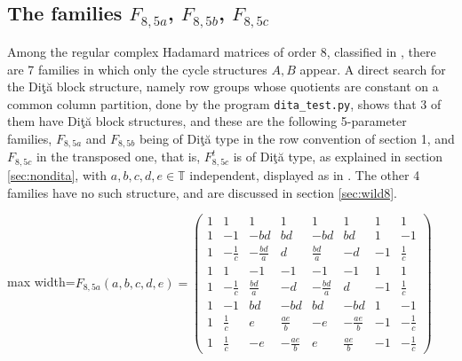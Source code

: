 \documentclass[11pt]{amsart}
\newcommand{\T}{\mathbb T}
\begin{document}
\subsection{The families $F_{8,5a}$, $F_{8,5b}$, $F_{8,5c}$}\label{sec:f85}

Among the regular complex Hadamard matrices of order 8, classified in \cite{gt}, there are 7 families in which only the cycle structures $A,B$ appear. A direct search for the Di\c t\u a block structure, namely row groups whose quotients are constant on a common column partition, done by the program \texttt{dita\_test.py}, shows that 3 of them have Di\c t\u a block structures, and these are the following 5-parameter families, $F_{8,5a}$ and $F_{8,5b}$ being of Di\c t\u a type in the row convention of section 1, and $F_{8,5c}$ in the transposed one, that is, $F_{8,5c}^t$ is of Di\c t\u a type, as explained in section \ref{sec:nondita}, with $a,b,c,d,e\in\T$ independent, displayed as in \cite{gt}. The other 4 families have no such structure, and are discussed in section \ref{sec:wild8}.

\begin{center}\normalsize\setlength{\arraycolsep}{3.8pt}
\begin{adjustbox}{max width=\textwidth}$\displaystyle F_{8,5a}(a,b,c,d,e)=\begin{pmatrix}
1 & 1 & 1 & 1 & 1 & 1 & 1 & 1 \\
1 & -1 & -bd & bd & -bd & bd & 1 & -1 \\
1 & -\frac{1}{c} & -\frac{bd}{a} & d & \frac{bd}{a} & -d & -1 & \frac{1}{c} \\
1 & 1 & -1 & -1 & -1 & -1 & 1 & 1 \\
1 & -\frac{1}{c} & \frac{bd}{a} & -d & -\frac{bd}{a} & d & -1 & \frac{1}{c} \\
1 & -1 & bd & -bd & bd & -bd & 1 & -1 \\
1 & \frac{1}{c} & e & \frac{ae}{b} & -e & -\frac{ae}{b} & -1 & -\frac{1}{c} \\
1 & \frac{1}{c} & -e & -\frac{ae}{b} & e & \frac{ae}{b} & -1 & -\frac{1}{c}
\end{pmatrix}$\end{adjustbox}
\end{center}
\end{document}
